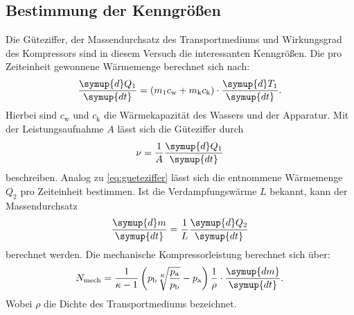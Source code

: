 \subsection{Bestimmung der Kenngrößen}
\label{sec:BdK}
Die Güteziffer, der Massendurchsatz des Transportmediums und Wirkungsgrad des Kompressors sind in diesem Versuch die
interessanten Kenngrößen.
Die pro Zeiteinheit gewonnene Wärmemenge berechnet sich nach:
\begin{equation}
	\frac{\symup{d}Q_1}{\symup{dt}}=(m_1c_{\text{w}}+m_{\text{k}}c_{\text{k}})\cdot \frac{\symup{d}T_1}{\symup{dt}}.
	\label{eq:gueteziffer}
\end{equation}
Hierbei sind $c_{\text{w}}$ und $c_{\text{k}}$ die Wärmekapazität des Wassers und der Apparatur.
Mit der Leistungsaufnahme $A$ lässt sich die Güteziffer durch
\begin{equation}
	\nu=\frac{1}{A}\frac{\symup{d}Q_1}{\symup{dt}}
    \label{eq:leistung}
\end{equation}
beschreiben.
Analog zu \eqref{eq:gueteziffer} lässt sich die entnommene Wärmemenge $Q_2$ pro Zeiteinheit bestimmen.
Ist die Verdampfungswärme $L$ bekannt, kann der Massendurchsatz
\begin{equation}
	\frac{\symup{d}m}{\symup{dt}}=\frac{1}{L}\frac{\symup{d}Q_2}{\symup{dt}}
	\label{eq:massendurchsatz}
\end{equation}
berechnet werden.
Die mechanische Kompressorleistung berechnet sich über:
\begin{equation}
	N_{\text{mech}} = \frac{1}{\kappa - 1} \left( p_{\text{b}} 
        \sqrt[{\leftroot{-1}\uproot{2}\scriptstyle \kappa}]{
        \frac{p_{\text{a}}}{p_{\text{b}}}} -p_{\text{a}}\right) 
        \frac{1}{\rho} \cdot 
        \frac{\symup{dm}}{\symup{dt}} .
	\label{eq:arbeit}
\end{equation}
Wobei $\rho$ die Dichte des Transportmediums bezeichnet.
